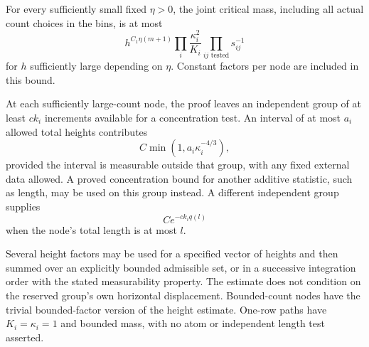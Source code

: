 \begin{proposition}
\label{R:geo:chain}
For every sufficiently small fixed $\eta>0$, the joint critical mass,
including all actual count choices in the bins, is at most
\begin{equation}\label{R:geo:chain-product}
 h^{C_1\eta(m+1)}\prod_i\frac{\kappa_i^2}{K_i}
                    \prod_{ij\text{ tested}}s_{ij}^{-1}
\end{equation}
for $h$ sufficiently large depending on $\eta$.  Constant factors per
node are included in this bound.

At each sufficiently large-count node, the proof leaves an independent
group of at least $c k_i$ increments available for a concentration test.
An interval of at most $a_i$ allowed total heights contributes
\begin{equation}\label{R:geo:height-factor}
                    C\min(1,a_i\kappa_i^{-4/3}),
\end{equation}
provided the interval is measurable outside that group, with any fixed
external data allowed.  A proved concentration bound for another
additive statistic, such as length, may be used on this group instead.
A different independent group supplies
\begin{equation}\label{R:geo:short-factor}
                         C e^{-c k_i q(l)}
\end{equation}
when the node's total length is at most $l$.

Several height factors may be used for a specified vector of heights and
then summed over an explicitly bounded admissible set, or in a successive
integration order with the stated measurability property.  The estimate
does not condition on the reserved group's own horizontal displacement.
Bounded-count nodes have the trivial bounded-factor version of the height
estimate.  One-row paths have $K_i=\kappa_i=1$ and bounded mass, with no
atom or independent length test asserted.
\end{proposition}
